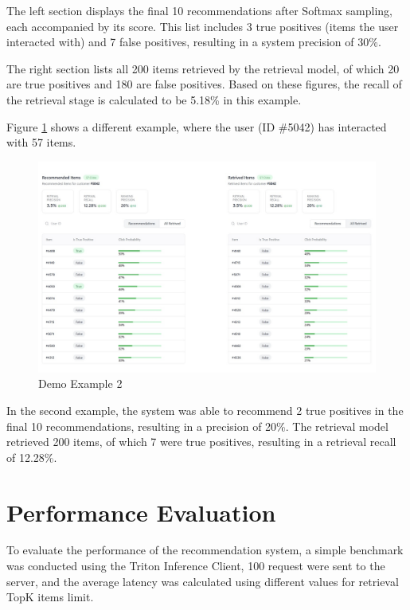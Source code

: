 The left section displays the final 10 recommendations after Softmax sampling, each accompanied by its score. This list includes 3 true positives (items the user interacted with) and 7 false positives, resulting in a system precision of 30\%.

The right section lists all 200 items retrieved by the retrieval model, of which 20 are true positives and 180 are false positives. Based on these figures, the recall of the retrieval stage is calculated to be 5.18\% in this example.

Figure \ref{fig: Demo2} shows a different example, where the user (ID \#5042) has interacted with 57 items.

\begin{figure}[H]
    \centering
    \includegraphics[width=\textwidth]{assets/demo_2.jpeg}
    \caption{Demo Example 2}
    \label{fig: Demo2}
\end{figure}

In the second example, the system was able to recommend 2 true positives in the final 10 recommendations, resulting in a precision of 20\%. 
The retrieval model retrieved 200 items, of which 7 were true positives, resulting in a retrieval recall of 12.28\%.


\section{Performance Evaluation}

To evaluate the performance of the recommendation system, a simple benchmark was conducted using the Triton Inference Client,
 100 request were sent to the server, and the average latency was calculated using different values for retrieval TopK items limit.

